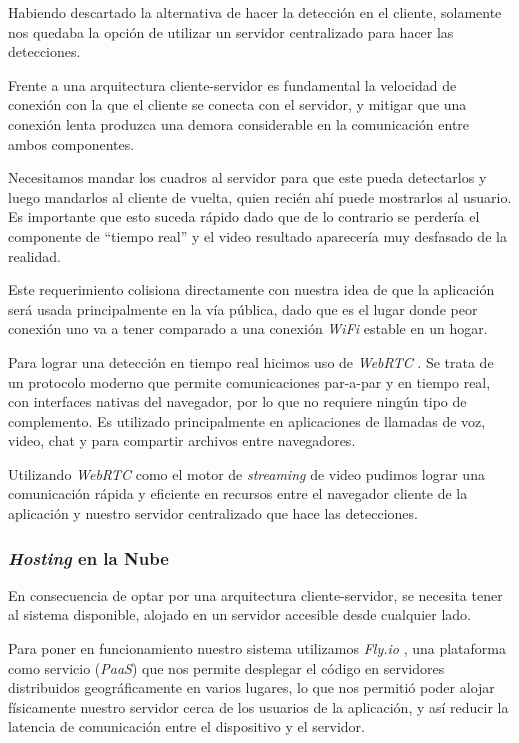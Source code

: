 \documentclass[a4paper]{article}
\begin{document}
Habiendo descartado la alternativa de hacer la detección en el cliente, solamente nos quedaba la opción de utilizar un servidor centralizado para hacer las detecciones.

Frente a una arquitectura cliente-servidor es fundamental la velocidad de conexión con la que el cliente se conecta con el servidor, y mitigar que una conexión lenta produzca una demora considerable en la comunicación entre ambos componentes.

Necesitamos mandar los cuadros al servidor para que este pueda detectarlos y luego mandarlos al cliente de vuelta, quien recién ahí puede mostrarlos al usuario. Es importante que esto suceda rápido dado que de lo contrario se perdería el componente de ``tiempo real'' y el video resultado aparecería muy desfasado de la realidad.

Este requerimiento colisiona directamente con nuestra idea de que la aplicación será usada principalmente en la vía pública, dado que es el lugar donde peor conexión uno va a tener comparado a una conexión \textit{WiFi} estable en un hogar.\medskip

Para lograr una detección en tiempo real hicimos uso de \textit{WebRTC} \cite{webrtc}. Se trata de un protocolo moderno que permite comunicaciones par-a-par y en tiempo real, con interfaces nativas del navegador, por lo que no requiere ningún tipo de complemento. Es utilizado principalmente en aplicaciones de llamadas de voz, video, chat y para compartir archivos entre navegadores.

Utilizando \textit{WebRTC} como el motor de \textit{streaming} de video pudimos lograr una comunicación rápida y eficiente en recursos entre el navegador cliente de la aplicación y nuestro servidor centralizado que hace las detecciones.

\subsubsection{\textit{Hosting} en la Nube}

En consecuencia de optar por una arquitectura cliente-servidor, se necesita tener al sistema disponible, alojado en un servidor accesible desde cualquier lado.

Para poner en funcionamiento nuestro sistema utilizamos \textit{Fly.io} \cite{flyio}, una plataforma como servicio (\textit{PaaS}) que nos permite desplegar el código en servidores distribuidos geográficamente en varios lugares, lo que nos permitió poder alojar físicamente nuestro servidor cerca de los usuarios de la aplicación, y así reducir la latencia de comunicación entre el dispositivo y el servidor.
\end{document}
